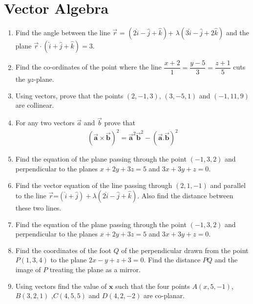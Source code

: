 \documentclass[12pt,-letter paper]{article}
\let\vec\mathbf{}
\let\vec\mathbf{}
\let\vec\mathbf{}
\let\vec\mathbf
\providecommand{\brak}[1]{\ensuremath{\left(#1\right)}}
\begin{document}
\section{Vector Algebra}
\begin{enumerate}

\item  Find the angle between the line $\overrightarrow{r}$ = $\brak{2\hat{i}-\hat{j}+\hat{k}}$+ $\lambda\brak{3\hat{i}-\hat{j}+2\hat{k}}$ and the plane $\overrightarrow{r}\cdot\brak{\hat{i} +\hat{j}+\hat{k}}=3$.

\item Find the co-ordinates of the point where the line $\dfrac{x+2}{1}=\dfrac{y-5}{3}=\dfrac{z+1}{5}$ cuts the $yz$-plane.

\item Using vectors, prove that the points $\brak{2,-1,3}$, $\brak{3,-5,1}$ and $\brak{-1,11,9}$ are collinear.

\item For any two vectors $\overrightarrow{a}$ and $\overrightarrow{b}$  prove that 
	\begin{align*}
	(\overrightarrow{\vec{a}}\times\overrightarrow{\vec{b}})^{2}=\overrightarrow{\vec{a}}^{2}\overrightarrow{\vec{b}}^{2}-(\overrightarrow{\vec{a}}.\overrightarrow{\vec{b}})^{2}
	\end{align*}
 
\item Find the equation of the plane passing through the point $\brak{-1,3,2}$ and perpendicular to the planes $x+2y+3z=5$ and $3x+3y+z=0$.

\item Find the vector equation of the line passing through $\brak{2,1,-1}$ and parallel to the line $\overrightarrow{r}$=$\brak{\hat{i}+\hat{j}}+\lambda\brak{2\hat{i}-\hat{j}+\hat{k}}$. Also find the distance between these two lines.

 \item Find the equation of the plane passing through the point $(-1,3,2)$ and perpendicular to the planes $x+2y+3z=5$ and $3x+3y+z=0$.
 
\item Find the coordinates of the foot $Q$ of the perpendicular drawn from the point $P\brak{1,3,4}$ to the plane $2x-y+z+3=0$. Find the distance $PQ$ and the image of $P$ treating the plane as a mirror. 

\item Using vectors find the value of $\vec{x}$ such that the four points $A\brak{x,5,-1}$, $B\brak{3,2,1}$ ,$C\brak{4,5,5}$ and $D\brak{4,2,-2}$ are co-planar.


\end{enumerate}
\end{document}
